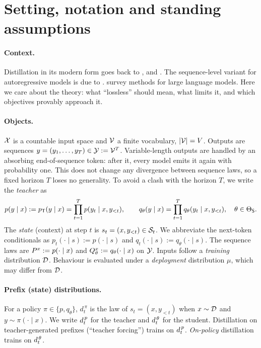 \section*{Setting, notation and standing assumptions}\label{sec:setup}

\paragraph{Context.}
Distillation in its modern form goes back to \citet{bucilua2006model}, \citet{ba2014do} and
\citet{hinton2015distilling}. The sequence-level variant for autoregressive models is due to
\citet{kim2016sequence}. \citet{xu2024survey} survey methods for large language models. Here we care
about the theory: what ``lossless'' should mean, what limits it, and which objectives provably approach it.

\paragraph{Objects.}
$\mathcal{X}$ is a countable input space and $\mathcal{V}$ a finite vocabulary, $|\mathcal{V}|=V$. Outputs are sequences
$y=(y_1,\dots,y_T)\in\mathcal{Y}:=\mathcal{V}^T$. Variable-length outputs are handled by an absorbing end-of-sequence
token: after it, every model emits it again with probability one. This does not change any divergence
between sequence laws, so a fixed horizon $T$ loses no generality. To avoid a clash with the
horizon $T$, we write the \emph{teacher} as
\[
p(y\mid x):=p_{\mathsf{T}}(y\mid x)=\prod_{t=1}^T p(y_t\mid x,y_{<t}),
\qquad
q_\theta(y\mid x)=\prod_{t=1}^T q_\theta(y_t\mid x,y_{<t}),\quad \theta\in\Theta_{\mathsf{S}}.
\]
The \emph{state} (context) at step $t$ is $s_t=(x,y_{<t})\in\mathcal{S}_t$. We abbreviate the next-token conditionals as
$p_t(\cdot\mid s):=p(\cdot\mid s)$ and $q_t(\cdot\mid s):=q_\theta(\cdot\mid s)$. The sequence laws are
$P^{x}:=p(\cdot\mid x)$ and $Q^{x}_{\theta}:=q_\theta(\cdot\mid x)$ on $\mathcal{Y}$.
Inputs follow a \emph{training} distribution $\mathcal{D}$. Behaviour is evaluated under a \emph{deployment}
distribution $\mu$, which may differ from $\mathcal{D}$.

\paragraph{Prefix (state) distributions.}
For a policy $\pi\in\{p,q_\theta\}$, $d^{\,\pi}_t$ is the law of $s_t=(x,y_{<t})$ when $x\sim\mathcal{D}$ and
$y\sim\pi(\cdot\mid x)$. We write $d^{\,p}_{t}$ for the teacher and $d^{\,\theta}_{t}$ for the student. Distillation on
teacher-generated prefixes (``teacher forcing'') trains on $d^{\,p}_{t}$. \emph{On-policy} distillation
trains on $d^{\,\theta}_{t}$.

